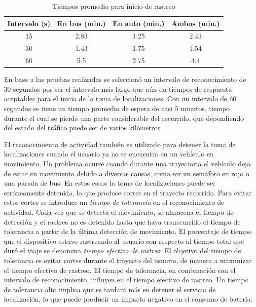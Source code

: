 \begin{table}[h]
  \centering
	\begin{tabular}{cccc}
	\toprule
	Intervalo (s) & En bus (min.) & En auto (min.) & Ambos (min.) \\
	\midrule
	15            & 2.83         & 1.25            & 2.43          \\
	30            & 1.43         & 1.75            & 1.54          \\
	60            & 5.5          & 2.75            & 4.4           \\
	\bottomrule
	\end{tabular}
  \caption{Tiempos promedio para inicio de rastreo}
  \label{tab:prom_intervalo_reconocimiento}
\end{table}

En base a las pruebas realizadas se seleccionó un intervalo de reconocimiento de 30 segundos por ser el intervalo más largo que aún da tiempos de respuesta aceptables para el inicio de la toma de localizaciones. Con un intervalo de 60 segundos se tiene un tiempo promedio de espera de casi 5 minutos, tiempo durante el cual se pierde una parte considerable del recorrido, que dependiendo del estado del tráfico puede ser de varios kilómetros.

El reconocimiento de actividad también es utilizado para detener la toma de localizaciones cuando el usuario ya no se encuentra en un vehículo en movimiento. Un problema ocurre cuando durante una trayectoria el vehículo deja de estar en movimiento debido a diversas causas, como ser un semáforo en rojo o una parada de bus. En estos casos la toma de localizaciones puede ser erróneamente detenida, lo que produce cortes en el trayecto recorrido. Para evitar estos cortes se introduce un \emph{tiempo de tolerancia} en el reconocimiento de actividad. Cada vez que se detecta el movimiento, se almacena el tiempo de detección y el rastreo no es detenido hasta que haya transcurrido el tiempo de tolerancia a partir de la última detección de movimiento. El porcentaje de tiempo que el dispositivo estuvo rastreando al usuario con respecto al tiempo total que duró el viaje se denomina \emph{tiempo efectivo de rastreo}. El objetivo del tiempo de tolerancia es evitar cortes durante el trayecto del usuario, de manera a maximizar el tiempo efectivo de rastreo. El tiempo de tolerancia, en combinación con el intervalo de reconocimiento, influyen en el tiempo efectivo de rastreo. Un tiempo de tolerancia alto implica que se tardará más en detener el servicio de localización, lo que puede producir un impacto negativo en el consumo de batería.

